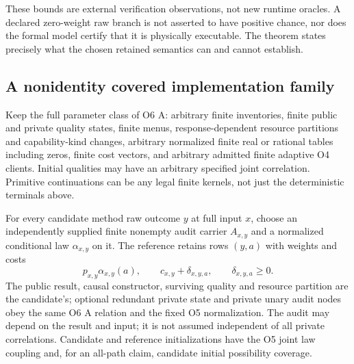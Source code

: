 \documentclass[11pt,a4paper]{article}
\theoremstyle{definition}
\begin{document}
These bounds are external verification observations, not new runtime
oracles. A declared zero-weight raw branch is not asserted to have
positive chance, nor does the formal model certify that it is physically
executable. The theorem states precisely what the chosen retained
semantics can and cannot establish.

\subsection{A nonidentity covered implementation family}
Keep the full parameter class of O6 A: arbitrary finite inventories,
finite public and private quality states, finite menus, response-dependent
resource partitions and capability-kind changes, arbitrary normalized
finite real or rational tables including zeros, finite cost vectors, and
arbitrary admitted finite adaptive O4 clients. Initial qualities may have
an arbitrary specified joint correlation. Primitive continuations can be
any legal finite kernels, not just the deterministic terminals above.

For every candidate method raw outcome $y$ at full input $x$, choose an
independently supplied finite nonempty audit carrier $A_{x,y}$ and a
normalized conditional law $\alpha_{x,y}$ on it. The reference retains
rows $(y,a)$ with weights and costs
\[
 p_{x,y}\alpha_{x,y}(a),\qquad
 c_{x,y}+\delta_{x,y,a},\qquad \delta_{x,y,a}\geq0.
\]
The public result, causal constructor, surviving quality and resource
partition are the candidate's; optional redundant private state and
private unary audit nodes obey the same O6 A relation and the fixed O5
normalization. The audit may depend on the result and input; it is not
assumed independent of all private correlations. Candidate and reference
initializations have the O5 joint law coupling and, for an all-path
claim, candidate initial possibility coverage.
\end{document}
